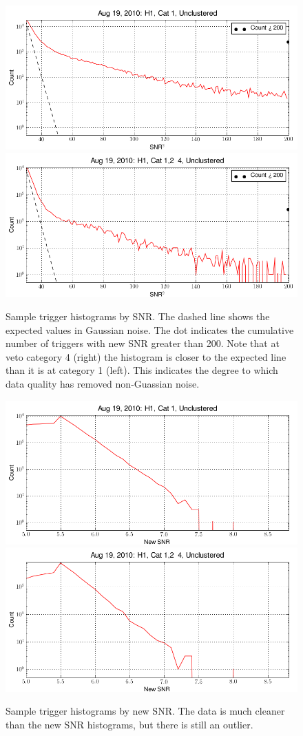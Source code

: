 \begin{figure}
  \includegraphics[width=0.5\linewidth]{figures/detchar/H1_1_UNCLUSTERED_snr_hist.png}
  \includegraphics[width=0.5\linewidth]{figures/detchar/H1_4_UNCLUSTERED_snr_hist.png}
  \caption[Trigger SNR histograms for H1]{
  \label{f:daily_ihope_gaussianity}
Sample trigger histograms by SNR.  The dashed line shows the
expected values in Gaussian noise.  The dot indicates the cumulative
number of triggers with new SNR greater than 200.  Note that at veto
category 4 (right) the histogram is closer to the expected line than
it is at category 1 (left).  This indicates the degree to which data
quality has removed non-Guassian noise.}
\end{figure}%



\begin{figure}
  \includegraphics[width=0.5\linewidth]{figures/detchar/H1_1_UNCLUSTERED_new_snr_hist.png}
  \includegraphics[width=0.5\linewidth]{figures/detchar/H1_4_UNCLUSTERED_new_snr_hist.png}
  \caption[Trigger new SNR histograms for H1]{
  \label{f:daily_ihope_gaussianity_newsnr}
Sample trigger histograms by new SNR. The data is much cleaner than
the new SNR histograms, but there is still an outlier.}
\end{figure}%



